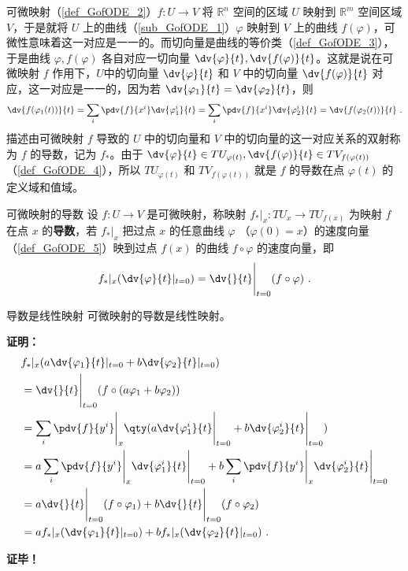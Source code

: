 
可微映射（\autoref{def_GofODE_2}）$f:U\rightarrow V$ 将 $\mathbb R^n$ 空间的区域 $U$ 映射到 $\mathbb R^m$ 空间区域 $V$，于是就将 $U$ 上的曲线（\autoref{sub_GofODE_1}）$\varphi$ 映射到 $V$ 上的曲线 $f(\varphi)$，可微性意味着这一对应是一一的。而切向量是曲线的等价类（\autoref{def_GofODE_3}），于是曲线 $\varphi,f(\varphi)$ 各自对应一切向量 $\dv{\varphi}{t},\dv{f(\varphi)}{t}$。这就是说在可微映射 $f$ 作用下，$U$中的切向量 $\dv{\varphi}{t}$ 和 $V$ 中的切向量 $\dv{f(\varphi)}{t}$ 对应，这一对应是一一的，因为若 $\dv{\varphi_1}{t}=\dv{\varphi_2}{t}$，则
\begin{equation}\label{eq_DoDifM_1}
\dv{f(\varphi_1(t))}{t}=\sum_i\pdv{f}{x^i}\dv{\varphi^i_1}{t}=\sum_i\pdv{f}{x^i}\dv{\varphi^i_2}{t}=\dv{f(\varphi_2(t))}{t}~.
\end{equation}
描述由可微映射 $f$ 导致的 $U$ 中的切向量和 $V$ 中的切向量的这一对应关系的双射称为 $f$ 的导数，记为 $f_*$。由于 $\dv{\varphi}{t}\in TU_{\varphi(t)} ,\dv{f(\varphi)}{t}\in TV_{f(\varphi(t))}$ （\autoref{def_GofODE_4}），所以 $TU_{\varphi(t)}$ 和 $TV_{f(\varphi(t))}$ 就是 $f$ 的导数在点 $\varphi(t)$ 的定义域和值域。

\begin{definition}{可微映射的导数}
设 $f:U\rightarrow V$ 是可微映射，称映射 $f_*|_x:TU_x\rightarrow TU_{f(x)}$ 为映射 $f$ 在点 $x$ 的\textbf{导数}，若 $f_*|_x$ 把过点 $x$ 的任意曲线 $\varphi$ （$\varphi(0)=x$）的速度向量（\autoref{def_GofODE_5}）映到过点 $f(x)$ 的曲线 $f\circ\varphi$ 的速度向量，即
\begin{equation}
f_*|_x(\dv{\varphi}{t}|_{t=0})=\dv{}{t}\Bigg|_{t=0}(f\circ\varphi)~.
\end{equation}
\end{definition}

\begin{theorem}{导数是线性映射}
可微映射的导数是线性映射。
\end{theorem}
\textbf{证明：}
\begin{equation}
\begin{aligned}
&f_*|_x(a\dv{\varphi_1}{t}|_{t=0}+b\dv{\varphi_2}{t}|_{t=0})\\
&=\dv{}{t}\Bigg|_{t=0}(f\circ(a\varphi_1+b\varphi_2))\\
&=\sum_i\pdv{f}{y^i}\Bigg|_{x}\qty(a\dv{\varphi^i_1}{t}\Bigg|_{t=0}+b\dv{\varphi^i_2}{t}\Bigg|_{t=0})\\
&=a\sum_i\pdv{f}{y^i}\Bigg|_{x}\dv{\varphi^i_1}{t}\Bigg|_{t=0}+b\sum_i\pdv{f}{y^i}\Bigg|_{x}\dv{\varphi^i_2}{t}\Bigg|_{t=0}\\
&=a\dv{}{t}\Bigg|_{t=0}(f\circ\varphi_1)+b\dv{}{t}\Bigg|_{t=0}(f\circ\varphi_2)\\
&=af_*|_x(\dv{\varphi_1}{t}|_{t=0})+bf_*|_x(\dv{\varphi_2}{t}|_{t=0})~.
\end{aligned}
\end{equation}



\textbf{证毕！}